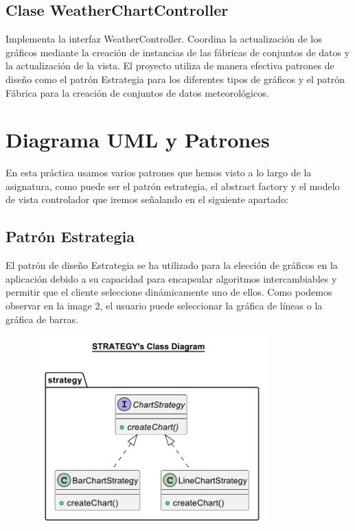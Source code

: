 \documentclass{article}
\begin{document}
\subsection{Clase WeatherChartController}
Implementa la interfaz WeatherController. Coordina la actualización de los gráficos mediante la creación de instancias de las fábricas de conjuntos de datos y la actualización de la vista. El proyecto utiliza de manera efectiva patrones de diseño como el patrón Estrategia para los diferentes tipos de gráficos y el patrón Fábrica para la creación de conjuntos de datos meteorológicos.

\section{Diagrama UML y Patrones}
En esta práctica usamos varios patrones que hemos visto a lo largo de la asignatura, como puede ser el patrón estrategia, el abstract factory y el modelo de vista controlador que iremos señalando en el siguiente apartado:

\subsection{Patrón Estrategia}
El patrón de diseño Estrategia se ha utilizado para la elección de gráficos en la aplicación debido a su capacidad para encapsular algoritmos intercambiables y permitir que el cliente seleccione dinámicamente uno de ellos. Como podemos observar en la image 2, el usuario puede seleccionar la gráfica de líneas o la gráfica de barras.

\begin{figure}[H]
  \centering
  \includegraphics[width=0.8\textwidth]{images/image2.png}
  \label{fig:image2}
\end{figure}
\end{document}
